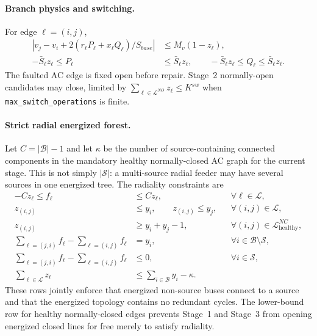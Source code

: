 \paragraph{Branch physics and switching.}
For edge $\ell=(i,j)$,
\begin{align}
|v_j-v_i+2(r_\ell P_\ell+x_\ell Q_\ell)/S_{base}| &\le M_v(1-z_\ell),
  \label{eq:cxx-vdrop}\\
-\bar S_\ell z_\ell \le P_\ell &\le \bar S_\ell z_\ell, \qquad
-\bar S_\ell z_\ell \le Q_\ell \le \bar S_\ell z_\ell.
  \label{eq:cxx-branch-limits}
\end{align}
The faulted AC edge is fixed open before repair.  Stage~2 normally-open
candidates may close, limited by
$\sum_{\ell\in\mathcal{L}^{NO}} z_\ell \le K^{sw}$ when
\texttt{max\_switch\_operations} is finite.

\paragraph{Strict radial energized forest.}
Let $C=|\mathcal{B}|-1$ and let $\kappa$ be the number of source-containing
connected components in the mandatory healthy normally-closed AC graph for the
current stage.  This is not simply $|\mathcal{S}|$: a multi-source radial feeder
may have several sources in one energized tree.  The radiality constraints are
\begin{align}
-Cz_\ell \le f_\ell &\le Cz_\ell, && \forall\ell\in\mathcal{L},
  \label{eq:cxx-f-bound}\\
z_{(i,j)} &\le y_i, \qquad z_{(i,j)} \le y_j,
  && \forall(i,j)\in\mathcal{L}, \label{eq:cxx-z-y}\\
z_{(i,j)} &\ge y_i+y_j-1,
  && \forall(i,j)\in\mathcal{L}^{NC}_{\mathrm{healthy}}, \label{eq:cxx-z-lower}\\
\sum_{\ell=(j,i)} f_\ell - \sum_{\ell=(i,j)} f_\ell &= y_i,
  && \forall i\in\mathcal{B}\setminus\mathcal{S}, \label{eq:cxx-flow-load}\\
\sum_{\ell=(j,i)} f_\ell - \sum_{\ell=(i,j)} f_\ell &\le 0,
  && \forall i\in\mathcal{S}, \label{eq:cxx-flow-source}\\
\sum_{\ell\in\mathcal{L}} z_\ell &\le
\sum_{i\in\mathcal{B}} y_i - \kappa. \label{eq:cxx-forest-count}
\end{align}
These rows jointly enforce that energized non-source buses connect to a source
and that the energized topology contains no redundant cycles.  The lower-bound
row for healthy normally-closed edges prevents Stage~1 and Stage~3 from opening
energized closed lines for free merely to satisfy radiality.

